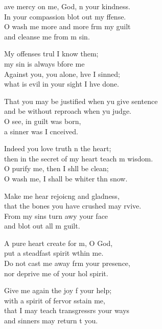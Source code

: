 \settowidth{\versewidth}{That you may be justified when you give sentence *}
\begin{psalmverse}%
  \begin{patverse}
ave mercy on me, God, \pointup{\i}n your kindness.\Med\\
In your compassion blot out my ffense.\\
O wash me more and more frm my guilt\Med\\
and cleanse me from m sin.

My offenses trul I know them;\Med\\
my sin is always bfore me\\
Against you, you alone, hve I sinned;\Med\\
what is evil in your sight I hve done.

That you may be justified when yu give sentence\Med\\
and be without reproach when yu judge.\\
O see, in guilt \pointup{\i} was born,\Med\\
a sinner was I cnceived.

Indeed you love truth \pointup{\i}n the heart;\Med\\
then in the secret of my heart teach m wisdom.\\
O purify me, then I shll be clean;\Med\\
O wash me, I shall be whiter thn snow.

Make me hear rejoic\pointup{\i}ng and gladness,\Med\\
that the bones you have crushed may rvive.\\
From my sins turn awy your face\Med\\
and blot out all m guilt.

A pure heart create for m, O God,\Med\\
put a steadfast spirit w\pointup{\i}thin me.\\
Do not cast me away frm your presence,\Med\\
nor deprive me of your hol spirit.

Give me again the joy f your help;\Med\\
with a spirit of fervor sstain me,\\
that I may teach transgressrs your ways\Med\\
and sinners may return t you.


\end{patverse}
\end{psalmverse}
